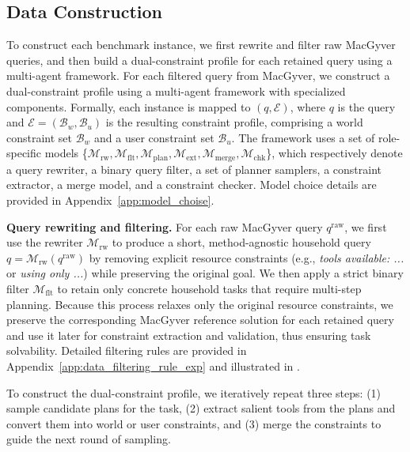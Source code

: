 \documentclass{llmxive}
\begin{document}
\subsection{Data Construction}
\label{sec:data-construction}
To construct each benchmark instance, we first rewrite and filter raw MacGyver queries, and then build a dual-constraint profile for each retained query using a multi-agent framework.
For each filtered query from MacGyver, we construct a dual-constraint profile using a multi-agent framework with specialized components. Formally, each instance is mapped to $(q,\mathcal{E})$, where $q$ is the query and $\mathcal{E}=(\mathcal{B}_{w},\mathcal{B}_{u})$ is the resulting constraint profile, comprising a world constraint set $\mathcal{B}_{w}$ and a user constraint set $\mathcal{B}_{u}$. The framework uses a set of role-specific models \{${\mathcal{M}_{\mathrm{rw}}, \mathcal{M}_{\mathrm{flt}}, \mathcal{M}_{\mathrm{plan}}, \mathcal{M}_{\mathrm{ext}}, \mathcal{M}_{\mathrm{merge}}, \mathcal{M}_{\mathrm{chk}}}$\}, which respectively denote a query rewriter, a binary query filter, a set of planner samplers, a constraint extractor, a merge model, and a constraint checker. Model choice details are provided in Appendix~\ref{app:model_choise}.

\noindent\textbf{Query rewriting and filtering.}
For each raw MacGyver query $q^{\mathrm{raw}}$, we first use the rewriter $\mathcal{M}_{\mathrm{rw}}$ to produce a short, method-agnostic household query {\small $q=\mathcal{M}_{\mathrm{rw}}(q^{\mathrm{raw}})$} by removing explicit resource constraints (e.g., \textit{tools available: ...} or \textit{using only ...}) while preserving the original goal. We then apply a strict binary filter $\mathcal{M}_{\mathrm{flt}}$ to retain only concrete household tasks that require multi-step planning. 
Because this process relaxes only the original resource constraints, we preserve the corresponding MacGyver reference solution for each retained query and use it later for constraint extraction and validation, thus ensuring task solvability. 
Detailed filtering rules are provided in Appendix~\ref{app:data_filtering_rule_exp} and illustrated in .

To construct the dual-constraint profile, we iteratively repeat three steps: (1) sample candidate plans for the task, (2) extract salient tools from the plans and convert them into world or user constraints, and (3) merge the constraints to guide the next round of sampling.
\end{document}
